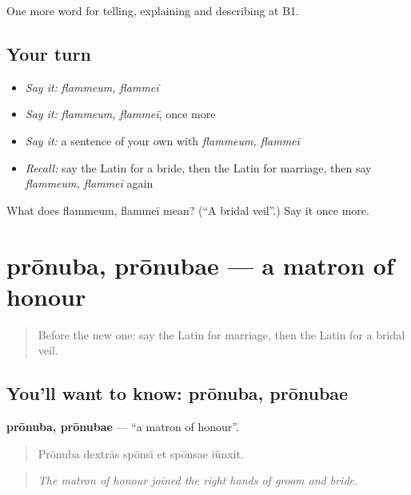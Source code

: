 \begin{grammarlens}[title={What you've built}]
One more word for telling, explaining and describing at B1.
\end{grammarlens}

\subsection*{Your turn}
\begin{itemize}
\raggedright
  \item \emph{Say it:} \emph{flammeum, flammeī}
  \item \emph{Say it:} \emph{flammeum, flammeī}, once more
  \item \emph{Say it:} a sentence of your own with \emph{flammeum, flammeī}
  \item \emph{Recall:} say the Latin for a bride, then the Latin for marriage, then say \emph{flammeum, flammeī} again
\end{itemize}

\begin{tcolorbox}[breakable,colback=teal!4,colframe=teal!35!black,title={Before you move on}]
What does flammeum, flammeī mean? (\textquotedblleft{}A bridal veil\textquotedblright{}.) Say it once more.
\end{tcolorbox}
\section[prōnuba, prōnubae]{prōnuba, prōnubae — a matron of honour}

\label{lesson:LA-C328-pronuba}



\begin{quote}
Before the new one: say the Latin for marriage, then the Latin for a bridal veil.
\end{quote}

\subsection*{You'll want to know: prōnuba, prōnubae}
\textbf{prōnuba, prōnubae} — \textquotedblleft{}a matron of honour\textquotedblright{}.

\begin{quote}
Prōnuba dextrās spōnsī et spōnsae iūnxit.
\end{quote}

\begin{quote}
\emph{The matron of honour joined the right hands of groom and bride.}
\end{quote}


